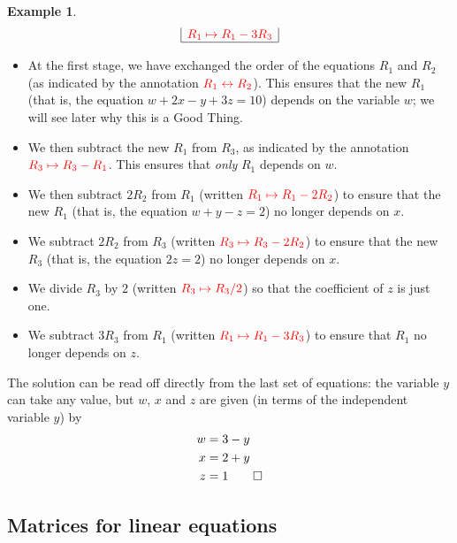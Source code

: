 \documentclass[a4paper]{book}
\newcommand{\RED}[1]{{\color{red}#1}}
\renewcommand{\:}{\colon}
\newcommand{\EMPH}[1]{\RED{\emph{#1}}}
\theoremstyle{definition}
\newtheorem{example}[theorem]{Example}
\begin{document}
\begin{example}
{\[\begin{array}{|c|c|c|}
 \RED{R_1 \mapsto R_1-3R_3} \\
 \hline
 \end{array}
 \]}
 \begin{itemize}
  \item At the first stage, we have exchanged the order of the equations
   $R_1$ and $R_2$ (as indicated by the annotation
   $\RED{R_1\leftrightarrow R_2}$).  This ensures that the new $R_1$
   (that is, the equation $w+2x-y+3z=10$) depends on the variable $w$;
   we will see later why this is a Good Thing.
  \item We then subtract the new $R_1$ from $R_3$, as indicated by the
   annotation $\RED{R_3\mapsto R_3-R_1}$.  This ensures that \EMPH{only}
   $R_1$ depends on $w$.
  \item We then subtract $2R_2$ from $R_1$ (written
   $\RED{R_1\mapsto R_1-2R_2}$) to ensure that the new $R_1$ (that is,
   the equation $w+y-z=2$) no longer depends on $x$.
  \item We subtract $2R_2$ from $R_3$ (written
   $\RED{R_3\mapsto R_3-2R_2}$) to ensure that the new $R_3$ (that is,
   the equation $2z=2$) no longer depends on $x$.
  \item We divide $R_3$ by $2$ (written $\RED{R_3\mapsto R_3/2}$) so
   that the coefficient of $z$ is just one.
  \item We subtract $3R_3$ from $R_1$ (written $\RED{R_1\mapsto R_1-3R_3}$) to
   ensure that $R_1$ no longer depends on $z$.
 \end{itemize}
 The solution can be read off directly from the last set of equations:
 the variable $y$ can take any value, but $w$, $x$ and $z$ are given
 (in terms of the independent variable $y$) by
 \begin{align*}
  w &= 3-y  \\
  x &= 2+y   \\
  z &= 1 \qed
 \end{align*}
\end{example}

\subsection{Matrices for linear equations}
\label{subsec-mat-lin}
\end{document}
